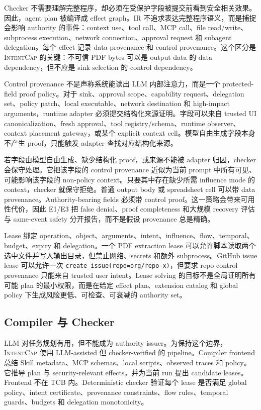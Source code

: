 \documentclass[UTF8,a4paper,11pt]{ctexart}
\newcommand{\sys}{\textsc{IntentCap}\xspace}
\begin{document}
Checker 不需要理解完整程序，却必须在受保护字段被提交前看到安全相关效果。因此，agent plan 被编译成 effect graph。IR 不追求表达完整程序语义，而是捕捉会影响 authority 的事件：context use、tool call、MCP call、file read/write、subprocess execution、network connection、approval request 和 subagent delegation。每个 effect 记录 data provenance 和 control provenance。这个区分是 \sys 的关键：不可信 PDF bytes 可以是 output data 的 data dependency，但不应是 sink selection 的 control dependency。

Control provenance 不是声称系统能读出 LLM 内部注意力，而是一个 protected-field proof policy。对于 sink、approval scope、capability request、delegation set、policy patch、local executable、network destination 和 high-impact arguments，runtime adapter 必须提交结构化来源证明。字段可以来自 trusted UI canonicalization、fresh approval、tool registry/schema、runtime observer、context placement gateway，或某个 explicit context cell。模型自由生成字段本身不产生 proof，只能触发 adapter 查找对应结构化来源。

若字段由模型自由生成、缺少结构化 proof，或来源不能被 adapter 归因，checker 会保守处理。它把该字段的 control provenance 近似为当前 prompt 中所有可见、可能影响该字段的 non-policy context。只要其中存在缺少所需 influence mode 的 context，checker 就保守拒绝。普通 output body 或 spreadsheet cell 可以带 data provenance。Authority-bearing fields 必须带 control proof。这一策略会带来可用性代价，因此 E1/E3 把 false denial、proof completeness 和大规模 recovery 评估与 same-event safety 分开报告，而不是假设 provenance 总是精确。

Lease 绑定 operation、object、arguments、intent、influence、flow、temporal、budget、expiry 和 delegation。一个 PDF extraction lease 可以允许脚本读取两个选中文件并写入输出目录，但禁止网络、secrets 和额外 subprocess。GitHub issue lease 可以允许一次 \texttt{create\_issue(repo=org/repo-x)}，但要求 repo control provenance 只能来自 trusted user intent。Lease solving 的目标不是全局证明所有可能 plan 的最小权限，而是在给定 effect plan、extension catalog 和 global policy 下生成风险更低、可检查、可衰减的 authority set。

\subsection{Compiler 与 Checker}

LLM 对任务规划有用，但不能成为 authority issuer。为保持这个边界，\sys 使用 LLM-assisted 但 checker-verified 的 pipeline。Compiler frontend 总结 Skill metadata、MCP schemas、local scripts、observed traces 和 policy。它推导 plan 与 security-relevant effects，并为当前 run 提出 candidate leases。Frontend 不在 TCB 内。Deterministic checker 验证每个 lease 是否满足 global policy、intent certificate、provenance constraints、flow rules、temporal guards、budgets 和 delegation monotonicity。
\end{document}
